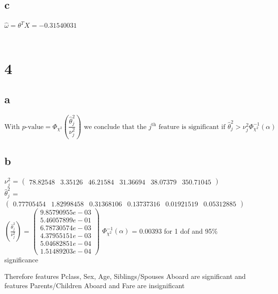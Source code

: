 \documentclass{article}
\begin{document}
\subsection{c}
$\hat{\omega} = \theta^TX = -0.31540031$ \\
 \\
\section{4}
\subsection{a}
\begin{equation}
\text{With } p\text{-value} = \Phi_{\chi^2}\left(\frac{\widehat{\theta}_j^2}{\nu_j^2}\right) \text{ we conclude that the } j^\text{th} \text{ feature is significant if $\widehat{\theta}_j^2 > \nu_j^2 \Phi_{\chi^2}^{-1}(\alpha)$}
\end{equation}

\subsection{b}
$\nu_j^2$ = $
\begin{pmatrix}
78.82548 &  3.35126 & 46.21584 & 31.36694 & 38.07379 & 350.71045
 \end{pmatrix} $
 \\
$\widehat{\theta}_j^2$ = $
\begin{pmatrix}
0.77705454 & 1.82998458 & 0.31368106 & 0.13737316 & 0.01921519 & 0.05312885
 \end{pmatrix} $
$\left(\frac{\widehat{\theta}_j^2}{\nu_j^2}\right)$ = $
\begin{pmatrix}
9.85790955e-03 \\ 5.46057899e-01 \\  6.78730574e-03 \\ 4.37955151e-03 \\
5.04682851e-04 \\ 1.51489203e-04
\end{pmatrix}
$
$\Phi_{\chi^2}^{-1}(\alpha)$ = 0.00393 for 1 dof and 95\% significance

Therefore features Pclass, Sex, Age, Siblings/Spouses Aboard are significant and 
features Parents/Children Aboard and Fare are insignificant 
\end{document}
